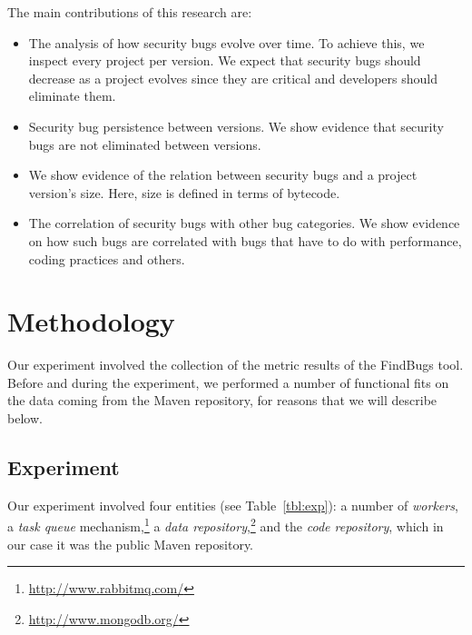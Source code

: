 \documentclass[conference]{llncs}
\begin{document}
The main contributions of this research are:
\begin{itemize}
	\item The analysis of how security bugs evolve over time. To achieve
this, we inspect every project per version. We expect that security
bugs should decrease as a project evolves since they are critical and developers
should eliminate them.
	\item Security bug persistence between versions. We show evidence that
security bugs are not eliminated between versions.
	\item We show evidence of the relation between security bugs and a project
version's size.  Here, size is defined in terms of bytecode.
	\item The correlation of security bugs with other bug categories. We
show evidence on how such bugs are correlated with bugs that have to do with
performance, coding practices and others.
\end{itemize}


\section{Methodology}
\label{sec:meth}

Our experiment involved the collection of the metric results of the FindBugs
tool. Before and during the experiment, we performed a number of functional
fits on the data coming from the Maven repository, for reasons that we will describe below.

\subsection{Experiment}
\label{sec:exp}

Our experiment involved four entities (see Table~\ref{tbl:exp}):
a number of {\it workers}, a {\it task queue}
mechanism,\footnote{\url{http://www.rabbitmq.com/}}
a {\it data repository},\footnote{\url{http://www.mongodb.org/}}
and the {\it code repository}, which in our case it was
the public Maven repository.
\end{document}
